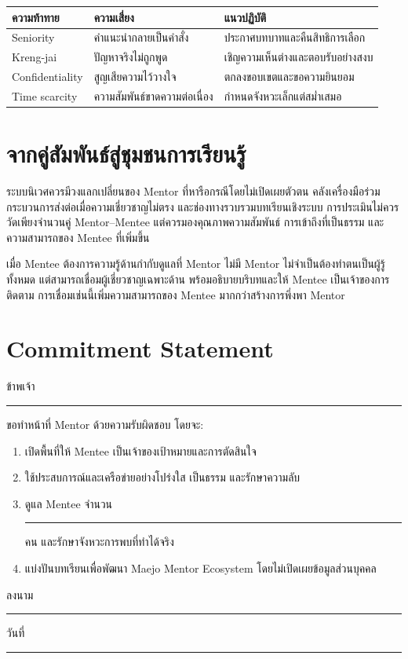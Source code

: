 \begin{longtable}{P{.22\textwidth}P{.31\textwidth}P{.34\textwidth}}
\toprule
\textbf{ความท้าทาย} & \textbf{ความเสี่ยง} & \textbf{แนวปฏิบัติ}\\
\midrule
Seniority & คำแนะนำกลายเป็นคำสั่ง & ประกาศบทบาทและคืนสิทธิการเลือก\\
Kreng-jai & ปัญหาจริงไม่ถูกพูด & เชิญความเห็นต่างและตอบรับอย่างสงบ\\
Confidentiality & สูญเสียความไว้วางใจ & ตกลงขอบเขตและขอความยินยอม\\
Time scarcity & ความสัมพันธ์ขาดความต่อเนื่อง & กำหนดจังหวะเล็กแต่สม่ำเสมอ\\
\bottomrule
\end{longtable}

\section{จากคู่สัมพันธ์สู่ชุมชนการเรียนรู้}
ระบบนิเวศควรมีวงแลกเปลี่ยนของ Mentor ที่หารือกรณีโดยไม่เปิดเผยตัวตน คลังเครื่องมือร่วม กระบวนการส่งต่อเมื่อความเชี่ยวชาญไม่ตรง และช่องทางรวบรวมบทเรียนเชิงระบบ การประเมินไม่ควรวัดเพียงจำนวนคู่ Mentor--Mentee แต่ควรมองคุณภาพความสัมพันธ์ การเข้าถึงที่เป็นธรรม และความสามารถของ Mentee ที่เพิ่มขึ้น

\begin{examplebox}
เมื่อ Mentee ต้องการความรู้ด้านกำกับดูแลที่ Mentor ไม่มี Mentor ไม่จำเป็นต้องทำตนเป็นผู้รู้ทั้งหมด แต่สามารถเชื่อมผู้เชี่ยวชาญเฉพาะด้าน พร้อมอธิบายบริบทและให้ Mentee เป็นเจ้าของการติดตาม การเชื่อมเช่นนี้เพิ่มความสามารถของ Mentee มากกว่าสร้างการพึ่งพา Mentor
\end{examplebox}

\section{Commitment Statement}
\begin{reflection}
ข้าพเจ้า \rule{.55\textwidth}{.4pt} ขอทำหน้าที่ Mentor ด้วยความรับผิดชอบ โดยจะ:
\begin{enumerate}
  \item เปิดพื้นที่ให้ Mentee เป็นเจ้าของเป้าหมายและการตัดสินใจ
  \item ใช้ประสบการณ์และเครือข่ายอย่างโปร่งใส เป็นธรรม และรักษาความลับ
  \item ดูแล Mentee จำนวน \rule{12mm}{.4pt} คน และรักษาจังหวะการพบที่ทำได้จริง
  \item แบ่งปันบทเรียนเพื่อพัฒนา Maejo Mentor Ecosystem โดยไม่เปิดเผยข้อมูลส่วนบุคคล
\end{enumerate}
ลงนาม \rule{.35\textwidth}{.4pt}\hfill วันที่ \rule{.22\textwidth}{.4pt}
\end{reflection}

